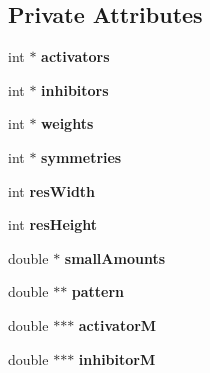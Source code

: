 \subsection*{Private Attributes}
\begin{DoxyCompactItemize}
\item 
\hypertarget{class_turing_a834503086ec6e48d169c13a5048a70d6}{int $\ast$ {\bfseries activators}}\label{class_turing_a834503086ec6e48d169c13a5048a70d6}

\item 
\hypertarget{class_turing_a685fb1e8cdd55e677a833232585487bf}{int $\ast$ {\bfseries inhibitors}}\label{class_turing_a685fb1e8cdd55e677a833232585487bf}

\item 
\hypertarget{class_turing_a1582c90c5d4b79422d5fa5613e239d73}{int $\ast$ {\bfseries weights}}\label{class_turing_a1582c90c5d4b79422d5fa5613e239d73}

\item 
\hypertarget{class_turing_a4b6ced77e854b8173eaea69eb5b19f54}{int $\ast$ {\bfseries symmetries}}\label{class_turing_a4b6ced77e854b8173eaea69eb5b19f54}

\item 
\hypertarget{class_turing_a6928df31ab2d0d30078785a686bd7fac}{int {\bfseries res\+Width}}\label{class_turing_a6928df31ab2d0d30078785a686bd7fac}

\item 
\hypertarget{class_turing_adbc9d55e7c3f4ea37eb96e9cd67a5cef}{int {\bfseries res\+Height}}\label{class_turing_adbc9d55e7c3f4ea37eb96e9cd67a5cef}

\item 
\hypertarget{class_turing_aa2d9bd89ddbe7d9f89c24b9a87146a39}{double $\ast$ {\bfseries small\+Amounts}}\label{class_turing_aa2d9bd89ddbe7d9f89c24b9a87146a39}

\item 
\hypertarget{class_turing_a3f8999ed810eb6ae42178121e3c1325c}{double $\ast$$\ast$ {\bfseries pattern}}\label{class_turing_a3f8999ed810eb6ae42178121e3c1325c}

\item 
\hypertarget{class_turing_a32ef6cf7e323f92dc729460943c3ed71}{double $\ast$$\ast$$\ast$ {\bfseries activator\+M}}\label{class_turing_a32ef6cf7e323f92dc729460943c3ed71}

\item 
\hypertarget{class_turing_abd93bc345ff9731a26acaab0fa18a2eb}{double $\ast$$\ast$$\ast$ {\bfseries inhibitor\+M}}\label{class_turing_abd93bc345ff9731a26acaab0fa18a2eb}


\end{DoxyCompactItemize}
